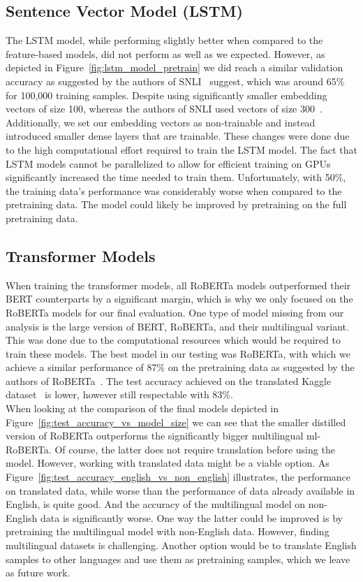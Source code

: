 \documentclass[acmsmall,nonacm]{acmart}
\begin{document}
\subsection{Sentence Vector Model (LSTM)}
The LSTM model, while performing slightly better when compared to the feature-based models, did not perform as well as we expected. 
However, as depicted in Figure~\ref{fig:lstm_model_pretrain} we did reach a similar validation accuracy as suggested by the authors of SNLI~\cite{snli-bowman2015} suggest, which was around 65\% for 100,000 training samples. Despite using significantly smaller embedding vectors of size 100, whereas the authors of SNLI used vectors of size 300~\cite{snli-bowman2015}. Additionally, we set our embedding vectors as non-trainable and instead introduced smaller dense layers that are trainable. These changes were done due to the high computational effort required to train the LSTM model. The fact that LSTM models cannot be parallelized to allow for efficient training on GPUs significantly increased the time needed to train them. Unfortunately, with 50\%, the training data's performance was considerably worse when compared to the pretraining data. The model could likely be improved by pretraining on the full pretraining data.


\subsection{Transformer Models}
When training the transformer models, all RoBERTa models outperformed their BERT counterparts by a significant margin, which is why we only focused on the RoBERTa models for our final evaluation. One type of model missing from our analysis is the large version of BERT, RoBERTa, and their multilingual variant. This was done due to the computational resources which would be required to train these models.
The best model in our testing was RoBERTa, with which we achieve a similar performance of 87\% on the pretraining data as suggested by the authors of RoBERTa~\cite{roberta-liu2019}. 
The test accuracy achieved on the translated Kaggle dataset~\cite{kaggle-dataset} is lower, however still respectable with 83\%. \\
When looking at the comparison of the final models depicted in Figure~\ref{fig:test_accuracy_vs_model_size} we can see that the smaller distilled version of RoBERTa outperforms the significantly bigger multilingual ml-RoBERTa. Of course, the latter does not require translation before using the model. 
However, working with translated data might be a viable option. As Figure~\ref{fig:test_accuracy_english_vs_non_english} illustrates, the performance on translated data, while worse than the performance of data already available in English, is quite good. And the accuracy of the multilingual model on non-English data is significantly worse. One way the latter could be improved is by pretraining the multilingual model with non-English data. However, finding multilingual datasets is challenging. Another option would be to translate English samples to other languages and use them as pretraining samples, which we leave as future work.
\end{document}
